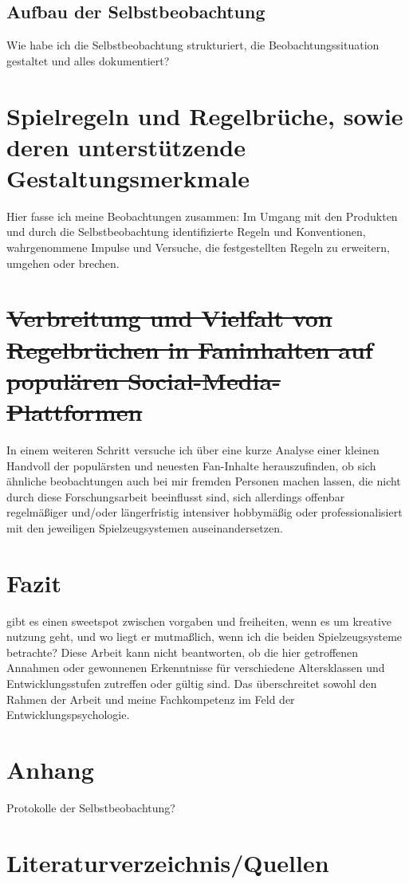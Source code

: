 \documentclass[11pt,a4paper,twoside]{scrreprt}
\begin{document}
	\section{Aufbau der Selbstbeobachtung}
Wie habe ich die Selbstbeobachtung strukturiert, die Beobachtungssituation gestaltet und alles dokumentiert?


\chapter{Spielregeln und Regelbrüche, sowie deren unterstützende Gestaltungsmerkmale}
Hier fasse ich meine Beobachtungen zusammen: Im Umgang mit den Produkten und durch die Selbstbeobachtung identifizierte Regeln und Konventionen, wahrgenommene Impulse und Versuche, die festgestellten Regeln zu erweitern, umgehen oder brechen.


\chapter{\sout{Verbreitung und Vielfalt von Regelbrüchen in Faninhalten auf populären Social-Media-Plattformen}}
In einem weiteren Schritt versuche ich über eine kurze Analyse einer kleinen Handvoll der populärsten und neuesten Fan-Inhalte herauszufinden, ob sich ähnliche beobachtungen auch bei mir fremden Personen machen lassen, die nicht durch diese Forschungsarbeit beeinflusst sind, sich allerdings offenbar regelmäßiger und/oder längerfristig intensiver hobbymäßig oder professionalisiert mit den jeweiligen Spielzeugsystemen auseinandersetzen.


\chapter{Fazit}
gibt es einen sweetspot zwischen vorgaben und freiheiten, wenn es um kreative nutzung geht, und wo liegt er mutmaßlich, wenn ich die beiden Spielzeugsysteme betrachte? Diese Arbeit kann nicht beantworten, ob die hier getroffenen Annahmen oder gewonnenen Erkenntnisse für verschiedene Altersklassen und Entwicklungsstufen zutreffen oder gültig sind. Das überschreitet sowohl den Rahmen der Arbeit und meine Fachkompetenz im Feld der Entwicklungspsychologie.

\chapter{Anhang}
Protokolle der Selbstbeobachtung? 

\fi
\chapter{Literaturverzeichnis/Quellen}
\printbibliography
\end{document}
